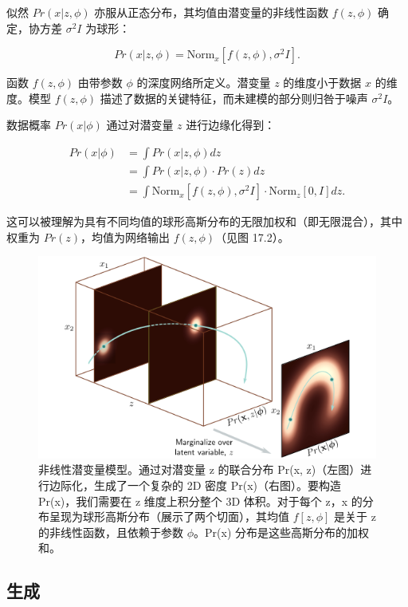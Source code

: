 似然 \(Pr(x|z, \phi)\) 亦服从正态分布，其均值由潜变量的非线性函数 \(f(z, \phi)\) 确定，协方差 \(\sigma^2 I\) 为球形：

\begin{equation}
Pr(x|z, \phi) = \text{Norm}_x\left[f(z, \phi), \sigma^2 I\right]. 
\end{equation}

函数 \(f(z, \phi)\) 由带参数 \(\phi\) 的深度网络所定义。潜变量 \(z\) 的维度小于数据 \(x\) 的维度。模型 \(f(z, \phi)\) 描述了数据的关键特征，而未建模的部分则归咎于噪声 \(\sigma^2I\)。

数据概率 \(Pr(x|\phi)\) 通过对潜变量 \(z\) 进行边缘化得到：


\begin{align}
Pr(x|\phi) &= \int Pr(x|z, \phi) dz \\
&= \int Pr(x|z, \phi) \cdot Pr(z) dz \\
&= \int \text{Norm}_x\left[f(z, \phi), \sigma^2 I\right] \cdot \text{Norm}_z[0, I] dz. 
\end{align} 


这可以被理解为具有不同均值的球形高斯分布的无限加权和（即无限混合），其中权重为 \(Pr(z)\)，均值为网络输出 \(f(z, \phi)\)（见图 17.2）。

\begin{figure}[ht!]
\centering
\includegraphics[width=0.7\linewidth]{png/chapter17/VAENonLinearLVM.png}
\caption{非线性潜变量模型。通过对潜变量 z 的联合分布 Pr(x, z)（左图）进行边际化，生成了一个复杂的 2D 密度 Pr(x)（右图）。要构造 Pr(x)，我们需要在 z 维度上积分整个 3D 体积。对于每个 z，x 的分布呈现为球形高斯分布（展示了两个切面），其均值 \(f[z, \phi]\) 是关于 z 的非线性函数，且依赖于参数 \(\phi\)。Pr(x) 分布是这些高斯分布的加权和。}
\end{figure}

\subsection{生成}

